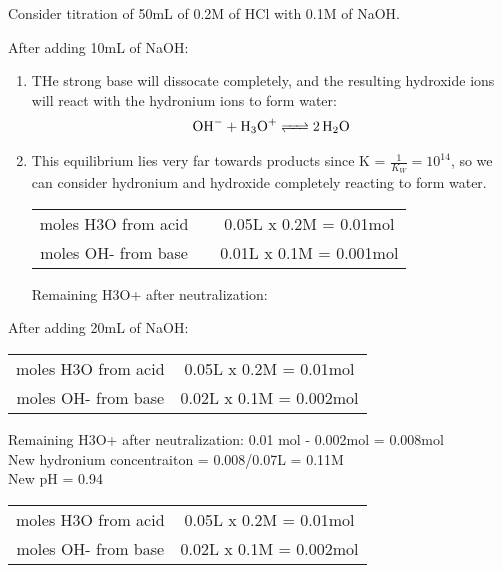 \documentclass[../CHEM152Notes.tex]{subfiles}
\begin{document}
\begin{exmp}
    Consider titration of 50mL of 0.2M of HCl with 0.1M of NaOH.
\end{exmp}
After adding 10mL of NaOH:
\begin{enumerate}
    \item THe strong base will dissocate completely, and the resulting hydroxide ions will react with the hydronium ions to form water:
    \begin{equation*}
        \begin{aligned}
            \ce{OH- + H3O+ <=> 2H2O}
        \end{aligned}
    \end{equation*}
    \item This equilibrium lies very far towards products since K = $\frac{1}{K_W} = 10^{14}$, so we can consider hydronium and hydroxide completely reacting to form water.
    \newline
    \begin{tabular}{c@{}c@{}c@{}}
        moles H3O from acid && 0.05L x 0.2M = 0.01mol \\
        moles OH- from base && 0.01L x 0.1M = 0.001mol \\
    \end{tabular}
    \newline
    Remaining H3O+ after neutralization:
\end{enumerate}
After adding 20mL of NaOH:
\begin{tabular}{c c}
    moles H3O from acid & 0.05L x 0.2M = 0.01mol \\
    moles OH- from base & 0.02L x 0.1M = 0.002mol \\
\end{tabular}
Remaining H3O+ after neutralization: 0.01 mol - 0.002mol = 0.008mol \\
New hydronium concentraiton =  0.008/0.07L = 0.11M \\
New pH = 0.94 \\
\newline
\begin{tabular}{ c c }
    moles H3O from acid & 0.05L x 0.2M = 0.01mol \\
    moles OH- from base & 0.02L x 0.1M = 0.002mol \\
\end{tabular}
\newline
\end{document}
